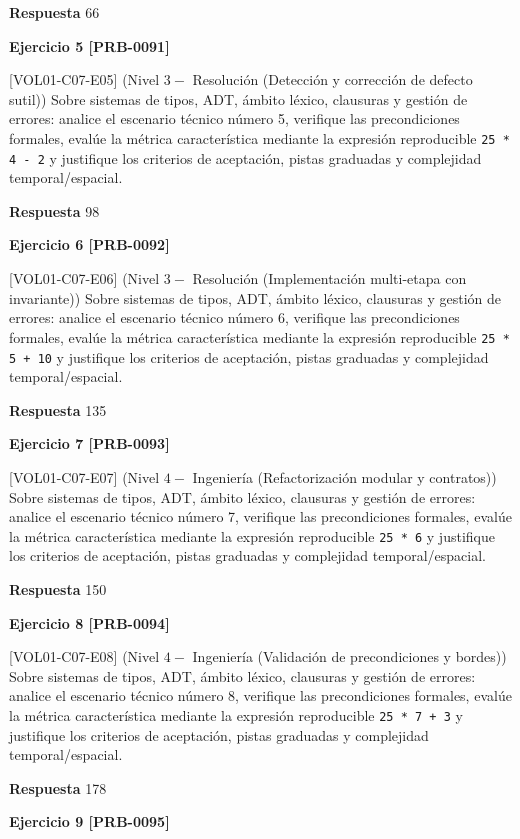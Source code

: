 \documentclass{book}
\begin{document}
\noindent\textbf{Respuesta} 66

\noindent\textbf{Ejercicio 5 [PRB-0091]}

[VOL01-C07-E05] (Nivel \(3 -\) Resolución (Detección y corrección de defecto sutil)) Sobre sistemas de tipos, ADT, ámbito léxico, clausuras y gestión de errores: analice el escenario técnico número 5, verifique las precondiciones formales, evalúe la métrica característica mediante la expresión reproducible \texttt{25 * 4 - 2} y justifique los criterios de aceptación, pistas graduadas y complejidad temporal/espacial.

\noindent\textbf{Respuesta} 98

\noindent\textbf{Ejercicio 6 [PRB-0092]}

[VOL01-C07-E06] (Nivel \(3 -\) Resolución (Implementación multi-etapa con invariante)) Sobre sistemas de tipos, ADT, ámbito léxico, clausuras y gestión de errores: analice el escenario técnico número 6, verifique las precondiciones formales, evalúe la métrica característica mediante la expresión reproducible \texttt{25 * 5 + 10} y justifique los criterios de aceptación, pistas graduadas y complejidad temporal/espacial.

\noindent\textbf{Respuesta} 135

\noindent\textbf{Ejercicio 7 [PRB-0093]}

[VOL01-C07-E07] (Nivel \(4 -\) Ingeniería (Refactorización modular y contratos)) Sobre sistemas de tipos, ADT, ámbito léxico, clausuras y gestión de errores: analice el escenario técnico número 7, verifique las precondiciones formales, evalúe la métrica característica mediante la expresión reproducible \texttt{25 * 6} y justifique los criterios de aceptación, pistas graduadas y complejidad temporal/espacial.

\noindent\textbf{Respuesta} 150

\noindent\textbf{Ejercicio 8 [PRB-0094]}

[VOL01-C07-E08] (Nivel \(4 -\) Ingeniería (Validación de precondiciones y bordes)) Sobre sistemas de tipos, ADT, ámbito léxico, clausuras y gestión de errores: analice el escenario técnico número 8, verifique las precondiciones formales, evalúe la métrica característica mediante la expresión reproducible \texttt{25 * 7 + 3} y justifique los criterios de aceptación, pistas graduadas y complejidad temporal/espacial.

\noindent\textbf{Respuesta} 178

\noindent\textbf{Ejercicio 9 [PRB-0095]}
\end{document}
